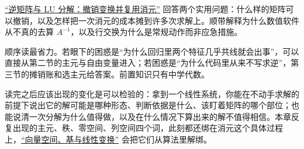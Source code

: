 \hyperref[sec:03-Linear-Algebra/01-Linear-Systems-and-Matrices/03]{``逆矩阵与 LU 分解：撤销变换并复用消元''} 回答两个实用问题：什么样的矩阵可以撤销，以及怎样把一次消元的成本摊到许多次求解上。顺带解释为什么数值软件从不真的去算 \(A^{-1}\)，以及行交换为什么是常规动作而非应急措施。

顺序读最省力。若眼下的困惑是``为什么回归里两个特征几乎共线就会出事''，可以直接从第二节的主元与自由变量进入；若困惑是``为什么代码里从来不写求逆''，第三节的摊销账和选主元给答案。前置知识只有中学代数。

读完之后应该出现的变化是可以检验的：拿到一个线性系统，你能在不动手求解的前提下说出它的解可能是哪种形态、判断依据是什么、该盯着矩阵的哪个部位；也能说清一次分解为什么值得做，以及在什么情况下算出来的解不值得相信。本章反复出现的主元、秩、零空间、列空间四个词，此刻都还绑在消元这个具体过程上，\hyperref[ch:017]{``向量空间、基与线性变换''} 会把它们从算法里解绑。
